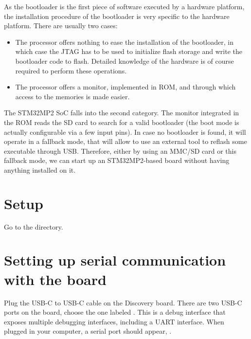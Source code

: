 
As the bootloader is the first piece of software executed by a
hardware platform, the installation procedure of the bootloader is
very specific to the hardware platform. There are usually two cases:

\begin{itemize}

\item The processor offers nothing to ease the installation of the
  bootloader, in which case the JTAG has to be used to initialize
  flash storage and write the bootloader code to flash. Detailed
  knowledge of the hardware is of course required to perform these
  operations.

\item The processor offers a monitor, implemented in ROM, and through
  which access to the memories is made easier.

\end{itemize}

The STM32MP2 SoC falls into the second category. The monitor
integrated in the ROM reads the SD card to search for a valid
bootloader (the boot mode is actually configurable via a few input
pins). In case no bootloader is found, it will operate in a fallback
mode, that will allow to use an external tool to reflash some
executable through USB. Therefore, either by using an MMC/SD card or
this fallback mode, we can start up an STM32MP2-based board without
having anything installed on it.

\section{Setup}

Go to the  directory.

\section{Setting up serial communication with the board}

Plug the USB-C to USB-C cable on the Discovery board. There are
two USB-C ports on the board, choose the one labeled .
This is a debug interface that exposes multiple debugging interfaces,
including a UART interface. When plugged in your computer, a serial
port should appear, {\tt \hosttty}.


